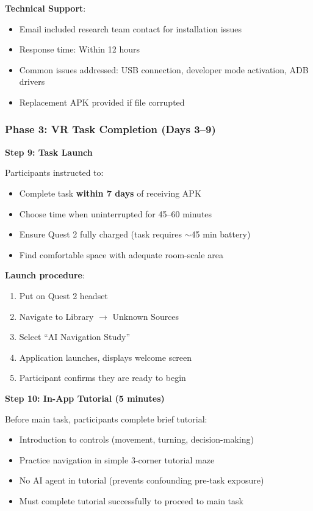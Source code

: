\documentclass[12pt]{article}
\begin{document}
\textbf{Technical Support}:
\begin{itemize}
    \item Email included research team contact for installation issues
    \item Response time: Within 12 hours
    \item Common issues addressed: USB connection, developer mode activation, ADB drivers
    \item Replacement APK provided if file corrupted
\end{itemize}

\subsubsection{Phase 3: VR Task Completion (Days 3--9)}

\textbf{Step 9: Task Launch}

Participants instructed to:
\begin{itemize}
    \item Complete task \textbf{within 7 days} of receiving APK
    \item Choose time when uninterrupted for 45--60 minutes
    \item Ensure Quest 2 fully charged (task requires $\sim$45 min battery)
    \item Find comfortable space with adequate room-scale area
\end{itemize}

\textbf{Launch procedure}:
\begin{enumerate}
    \item Put on Quest 2 headset
    \item Navigate to Library $\rightarrow$ Unknown Sources
    \item Select ``AI Navigation Study''
    \item Application launches, displays welcome screen
    \item Participant confirms they are ready to begin
\end{enumerate}

\textbf{Step 10: In-App Tutorial (5 minutes)}

Before main task, participants complete brief tutorial:
\begin{itemize}
    \item Introduction to controls (movement, turning, decision-making)
    \item Practice navigation in simple 3-corner tutorial maze
    \item No AI agent in tutorial (prevents confounding pre-task exposure)
    \item Must complete tutorial successfully to proceed to main task
\end{itemize}
\end{document}
